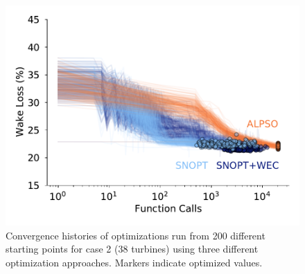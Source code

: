 \documentclass[a4paper]{jpconf}
\begin{document}
%
\begin{figure}[h]
	\centering
	\begin{minipage}[t]{.75\textwidth}
		\centering
		\includegraphics[width=\textwidth]{final_images/results/convergence_history_BPAmodel_38turbs_36dirs}  
		\caption{Convergence histories of optimizations run from 200 different starting points for case 2 (38 turbines) using three different optimization approaches. Markers indicate optimized values.}
		\label{fig:case-2-histories}
	\end{minipage} 
\end{figure}
%
\end{document}
